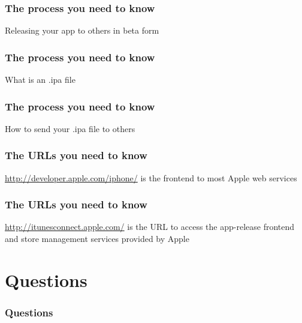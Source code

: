\documentclass[10pt]{beamer}
\begin{document}
    
\begin{frame}[fragile]
  \frametitle{The process you need to know}
  Releasing your app to others in beta form

\end{frame}

\begin{frame}[fragile]
  \frametitle{The process you need to know}
  What is an .ipa file

\end{frame}

\begin{frame}[fragile]
  \frametitle{The process you need to know}
  How to send your .ipa file to others

\end{frame}

    
\begin{frame}[fragile]
  \frametitle{The URLs you need to know}
  \url{http://developer.apple.com/iphone/} is the frontend to most Apple web services

\end{frame}

\begin{frame}[fragile]
  \frametitle{The URLs you need to know}
  \url{http://itunesconnect.apple.com/} is the URL to access the app-release frontend and store management services provided by Apple

\end{frame}

    

   
  

  
\section{Questions}
\begin{frame}[fragile]
  \frametitle{Questions}
  
\end{frame}


  


{}

\end{document}
